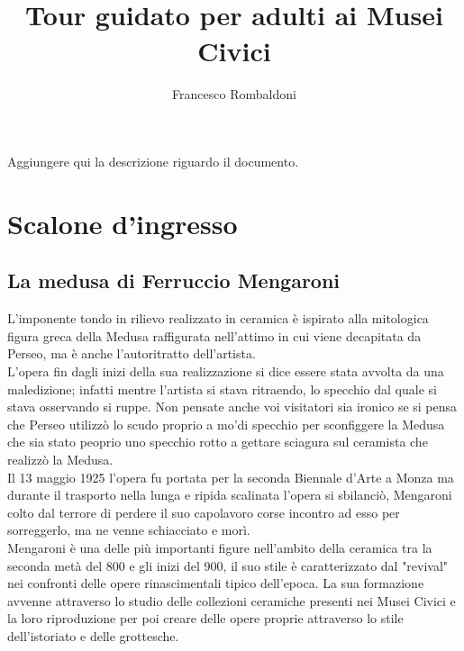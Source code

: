 \documentclass[hidelinks,12pt,a4paper]{article}
\begin{document}
	\begin{flushleft}
	
			\title{\textbf{\\Tour guidato per adulti ai Musei Civici}}
			\author{Francesco Rombaldoni}
			\date{}
	
			\maketitle
			
			\setcounter{page}{1}
			\newpage
			\vspace*{\fill}
			Aggiungere qui la descrizione riguardo il documento. 
			\vspace*{\fill}
			\newpage
			\tableofcontents
			\newpage
	
			\section{Scalone d'ingresso}
	
			\subsection{La medusa di Ferruccio Mengaroni}
			L'imponente tondo in rilievo realizzato in ceramica è ispirato alla mitologica figura greca della Medusa raffigurata nell'attimo in cui viene decapitata da Perseo, ma è anche l’autoritratto dell'artista.\\
			L'opera fin dagli inizi della sua realizzazione si dice essere stata avvolta da una maledizione; infatti mentre l'artista si stava ritraendo, lo specchio dal quale si stava osservando si ruppe. Non pensate anche voi visitatori sia ironico se si pensa che Perseo utilizzò lo scudo proprio a mo'di specchio per sconfiggere la Medusa che sia stato peoprio uno specchio rotto a gettare sciagura sul ceramista che realizzò la Medusa.\\
			Il 13 maggio 1925 l'opera fu portata per la seconda Biennale d'Arte a Monza ma durante il trasporto nella lunga e ripida scalinata l'opera si sbilanciò, Mengaroni colto dal terrore di perdere il suo capolavoro corse incontro ad esso per sorreggerlo, ma ne venne schiacciato e morì.\\
			Mengaroni è una delle più importanti figure nell'ambito della ceramica tra la seconda metà del 800 e gli inizi del 900, il suo stile è caratterizzato dal "revival" nei confronti delle opere rinascimentali tipico dell'epoca. La sua formazione avvenne attraverso lo studio delle collezioni ceramiche presenti nei Musei Civici e la loro riproduzione per poi creare delle opere proprie attraverso lo stile dell'istoriato e delle grottesche.
	

\end{flushleft}
\end{document}
